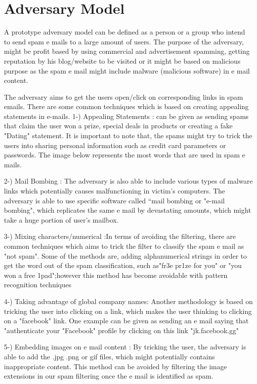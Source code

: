 \section{Adversary Model}
                    

A prototype adversary model can be defined as a person or a group who intend to send spam e mails to a large amount of users. The purpose of the adversary, might be profit based by using commercial and advertisement spamming, getting reputation by his blog/website to be visited or it might be based on malicious purpose as the spam e mail might include malware (malicious software) in e mail content. 

The adversary aims to get the users open/click on corresponding links in spam emails. There are some common techniques which is based on creating appealing statements in e-mails. 
1-) Appealing Statements : can be given as sending spams that claim the user won a prize, special deals in products or creating a fake "Dating" statement. It is important to note that, the spams might try to trick the users into sharing personal information such as credit card parameters or passwords. The image below represents the most words that are used in spam e mails. 

2-) Mail Bombing : The adversary is also able to include various types of malware links which potentially causes malfunctioning in victim's computers. The adversary is able to use specific software called “mail bombing or "e-mail bombing", which replicates the same e mail by devastating amounts, which might take a huge portion of user's mailbox. 

3-) Mixing characters/numerical :In terms of avoiding the filtering, there are common techniques which aims to trick the filter to classify the spam e mail as "not spam". Some of the methods are, adding alphanumerical strings in order to get the word out of the spam classification, such as"fr3e pr1ze for you" or "you won a free 1pad";however this method has become avoidable with pattern recognition techniques

4-) Taking advantage of global company names: Another methodology is based on tricking the user into clicking on a link, which makes the user thinking to clicking on a "facebook" link. One example can be given as sending an e mail saying that "authenticate your "Facebook" profile by clicking on this link "jk.facebook.gg"

5-) Embedding images on e mail content : By tricking the user, the adversary is able to add the .jpg .png or gif files, which might potentially contains inappropriate content. This method can be avoided by filtering the image extensions in  our spam filtering once the e mail is identified as spam.

